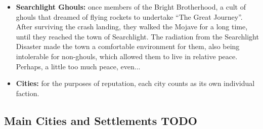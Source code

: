 \documentclass[11pt]{article} %
\begin{document}
\begin{itemize}
	\item \textbf{Searchlight Ghouls:} once members of the Bright Brotherhood, a cult of ghouls that dreamed of flying rockets to undertake ``The Great Journey''. After surviving the crash landing, they walked the Mojave for a long time, until they reached the town of Searchlight. The radiation from the Searchlight Disaster made the town a comfortable environment for them, also being intolerable for non-ghouls, which allowed them to live in relative peace. Perhaps, a little too much peace, even...
	
	\item \textbf{Cities:} for the purposes of reputation, each city counts as its own individual faction.
\end{itemize}

\subsection{Main Cities and Settlements TODO}
\end{document}
